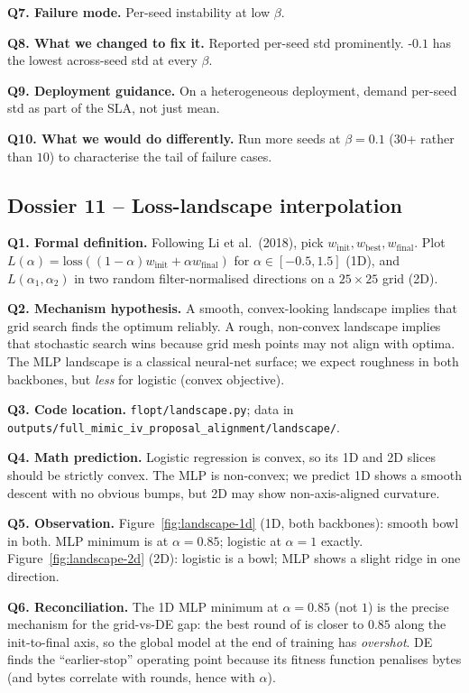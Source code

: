 \textbf{Q7. Failure mode.}
Per-seed instability at low $\beta$.

\textbf{Q8. What we changed to fix it.}
Reported per-seed std prominently. \fedprox{}-$0.1$ has the lowest
across-seed std at every $\beta$.

\textbf{Q9. Deployment guidance.}
On a heterogeneous deployment, demand per-seed std as part of the
SLA, not just mean.

\textbf{Q10. What we would do differently.}
Run more seeds at $\beta\!=\!0.1$ ($30$+ rather than $10$) to
characterise the tail of failure cases.

\subsection{Dossier 11 -- Loss-landscape interpolation}
\label{sec:dossier-landscape}

\textbf{Q1. Formal definition.}
Following Li et al.\ (2018), pick $w_{\text{init}}, w_{\text{best}},
w_{\text{final}}$. Plot $L(\alpha) \!=\! \text{loss}((1\!-\!\alpha)
w_{\text{init}} \!+\! \alpha w_{\text{final}})$ for
$\alpha \!\in\! [-0.5, 1.5]$ (1D), and
$L(\alpha_1, \alpha_2)$ in two random filter-normalised directions on
a $25\!\times\!25$ grid (2D).

\textbf{Q2. Mechanism hypothesis.}
A smooth, convex-looking landscape implies that grid search finds the
optimum reliably. A rough, non-convex landscape implies that
stochastic search wins because grid mesh points may not align with
optima. The MLP landscape is a classical neural-net surface; we
expect roughness in both backbones, but \emph{less} for logistic
(convex objective).

\textbf{Q3. Code location.}
\texttt{flopt/landscape.py}; data in
\texttt{outputs/full\_mimic\_iv\_proposal\_alignment/landscape/}.

\textbf{Q4. Math prediction.}
Logistic regression is convex, so its 1D and 2D slices should be
strictly convex. The MLP is non-convex; we predict 1D shows a smooth
descent with no obvious bumps, but 2D may show non-axis-aligned
curvature.

\textbf{Q5. Observation.}
Figure~\ref{fig:landscape-1d} (1D, both backbones): smooth bowl
in both. MLP minimum is at $\alpha\!=\!0.85$; logistic at $\alpha\!=\!1$
exactly. Figure~\ref{fig:landscape-2d} (2D): logistic is a
bowl; MLP shows a slight ridge in one direction.

\textbf{Q6. Reconciliation.}
The 1D MLP minimum at $\alpha\!=\!0.85$ (not $1$) is the precise
mechanism for the grid-vs-DE gap: the best round of \fedavg{} is
closer to $0.85$ along the init-to-final axis, so the global model
at the end of training has \emph{overshot}. DE finds the
``earlier-stop'' operating point because its fitness function
penalises bytes (and bytes correlate with rounds, hence with $\alpha$).

